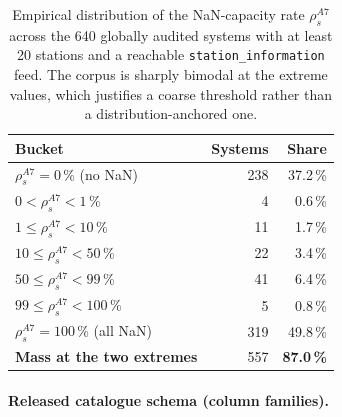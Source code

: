 \documentclass[11pt,a4paper]{article}
\begin{document}
\begin{table}[!htbp]
\centering
\caption{Empirical distribution of the NaN-capacity rate
$\rho_s^{A7}$ across the 640 globally audited systems with at least
20 stations and a reachable \texttt{station\_information} feed.
The corpus is sharply bimodal at the extreme values, which justifies
a coarse threshold rather than a distribution-anchored one.}
\label{tab:a7-distribution}
\small
\begin{tabular}{@{}lrr@{}}
\toprule
\textbf{Bucket} & \textbf{Systems} & \textbf{Share}\\
\midrule
$\rho_s^{A7} = 0$\,\% (no NaN)        & 238 & 37.2\,\% \\
$0 < \rho_s^{A7} < 1$\,\%              &   4 &  0.6\,\% \\
$1 \leq \rho_s^{A7} < 10$\,\%          &  11 &  1.7\,\% \\
$10 \leq \rho_s^{A7} < 50$\,\%         &  22 &  3.4\,\% \\
$50 \leq \rho_s^{A7} < 99$\,\%         &  41 &  6.4\,\% \\
$99 \leq \rho_s^{A7} < 100$\,\%        &   5 &  0.8\,\% \\
$\rho_s^{A7} = 100$\,\% (all NaN)      & 319 & 49.8\,\% \\
\midrule
\textbf{Mass at the two extremes} & 557 & \textbf{87.0\,\%} \\
\bottomrule
\end{tabular}
\end{table}


\paragraph{Released catalogue schema (column families).}
\end{document}

